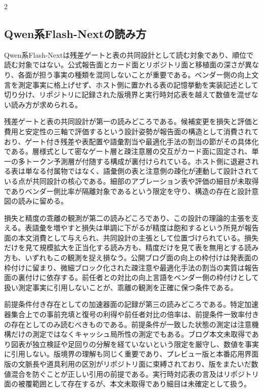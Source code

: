 \documentclass[lualatex,a4paper,10pt]{jlreq}
\begin{document}
\begin{multicols}{2}
\subsection{Qwen系Flash-Nextの読み方}
Qwen系Flash-Nextは残差ゲートと表の共同設計として読む対象であり、順位で読む対象ではない。公式報告面とカード面とリポジトリ面と移植面の深さが異なり、各面が担う事実の種類を混同しないことが重要である\autocite{qwen38next}\autocite{qwenreadme}\autocite{qwen38repo}。ベンダー側の向上文言を測定事実に格上げせず、ホスト側に置かれる表の記憶挙動を実装記述として切り分け、リポジトリに記録された版境界と実行時対応表を越えて数値を混ぜない読み方が求められる。

残差ゲートと表の共同設計が第一の読みどころである。候補変更を損失と評価と費用と安定性の三軸で評価するという設計姿勢が報告面の構造として消費されており、ゲート付き残差や表配置や語彙割当や最適化手法の割当の節がその具体化である\autocite{qwen38next}。層様式として密なゲート層と疎注意層の交互がカード面に固定され、単一の多トークン予測層が付随する構成が裏付けられている\autocite{qwenreadme}\autocite{qwen38next}。ホスト側に退避される表は単なる付属物ではなく、語彙側の表と注意側の疎化が連動して設計されている点が共同設計の核心である。細部のアブレーション表や評価の細目が未取得でありベンダー側比率が隔離対象であるという限定を守り、構造の存在と設計意図の読みに留める\autocite{qwen38next}。

損失と精度の乖離の観測が第二の読みどころであり、この設計の理論的主張を支える。表語彙を増やすと損失は単調に下がるが精度は飽和するという所見が報告面の本文消費として与えられ、共同設計の主張として位置づけられている\autocite{qwen38next}。損失だけを見て規模拡大を正当化する読み方も、精度だけを見て表を無用とする読み方も、いずれもこの観測を捉え損なう。公開ブログ面の向上の枠付けは発表面の枠付けに留まり、微細ブロック化された疎注意や最適化手法の割当の実質は報告面の裏付けに依存する\autocite{qwenblog}\autocite{qwen38next}。前任者との対比の向上言語をベンダー側の枠付けとして扱い測定事実に引用しないことが、乖離の観測を正確に保つ条件である。

前提条件付き存在としての加速器面の記録が第三の読みどころである。特定加速器集合上での事前充填と復号の利得や前任者対比の倍率は、前提条件一致率付きの存在としてのみ読むべきものである\autocite{nvblogqwen}。前提条件が一致した状態の測定は注意機構だけの測定ではなくキャッシュ局所性の測定でもある。ブログ本文未取得であり図表が独立検証や足回りの分解を経ていないという限定を厳守し、数値を事実に引用しない。版境界の理解も同じく重要であり、プレビュー版と本番応用界面版の文脈長や道具利用の区別がリポジトリ面に束縛されており、版をまたいだ数値混合を防ぐことが正しい引用の前提である\autocite{qwen38repo}。実行時対応表の言及はリポジトリ面の被覆範囲として存在するが、本文未取得であり細目は未確定として扱う\autocite{qwen38repo}。


\end{multicols}
\end{document}
